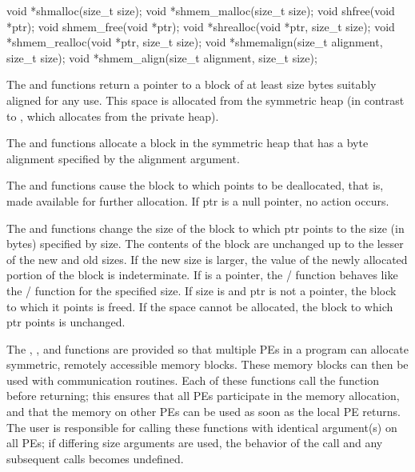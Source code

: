 \synC
void *shmalloc(size_t size);
void *shmem_malloc(size_t size);
void shfree(void *ptr);
void shmem_free(void *ptr);
void *shrealloc(void *ptr, size_t size);
void *shmem_realloc(void *ptr, size_t size);
void *shmemalign(size_t alignment, size_t size);
void *shmem_align(size_t alignment, size_t size);%

{
       The  and   functions return a pointer to a block of at least size
       bytes suitably aligned for any use.  This space is allocated from the
       symmetric heap (in contrast to , which allocates from the
       private heap).

       The   and  functions allocate a block in the symmetric heap that
       has a byte alignment specified by the alignment argument.

       The  and  functions cause the block to which  points to be
       deallocated, that is, made available for further allocation.  If ptr is
       a null pointer, no action occurs. 
              
       The   and   functions change the size of the block to which ptr
       points to the size (in bytes) specified by size.  The contents of the
       block are unchanged up to the lesser of the new and old sizes. If the
       new size is larger, the value of the newly allocated portion of the
       block is indeterminate.  
       If  is a  pointer, the / function behaves like the / function for the specified size.  If size  is  and ptr is not a  pointer, the block to which it points is freed. If the space cannot be allocated, the block to which ptr points is unchanged.

       The , , and  functions are provided  so that multiple \ac{PE}s in a program can allocate symmetric, remotely
       accessible memory blocks.  These memory blocks can then be used with
       \openshmem communication routines.  Each of these functions call the
        function before returning; this ensures that all
       \ac{PE}s participate in the memory allocation, and that the memory on other
       \ac{PE}s can be used	as  soon as the local \ac{PE} returns.  The user is
       responsible for calling these functions with identical argument(s) on
       all \ac{PE}s; if differing size arguments are used, the behavior of the call and any subsequent \openshmem calls becomes undefined.
}

